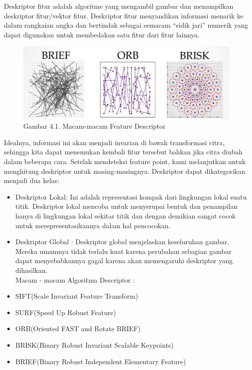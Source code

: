 \documentclass[
  letterpaper,
  DIV=11,
  numbers=noendperiod]{scrreprt}
\providecommand{\tightlist}{%
  \setlength{\itemsep}{0pt}\setlength{\parskip}{0pt}}\usepackage{longtable,booktabs,array}
\begin{document}
Deskriptor fitur adalah algoritme yang mengambil gambar dan menampilkan
deskriptor fitur/vektor fitur. Deskriptor fitur menyandikan informasi
menarik ke dalam rangkaian angka dan bertindak sebagai semacam ``sidik
jari'' numerik yang dapat digunakan untuk membedakan satu fitur dari
fitur lainnya.

\begin{figure}

{\centering \includegraphics{Asset/image12.png}

}

\caption{Gambar 4.1. Macam-macam Feature Descriptor}

\end{figure}

Idealnya, informasi ini akan menjadi invarian di bawah transformasi
citra, sehingga kita dapat menemukan kembali fitur tersebut bahkan jika
citra diubah dalam beberapa cara. Setelah mendeteksi feature point, kami
melanjutkan untuk menghitung deskriptor untuk masing-masingnya.
Deskriptor dapat dikategorikan menjadi dua kelas:

\begin{itemize}
\tightlist
\item
  Deskriptor Lokal: Ini adalah representasi kompak dari lingkungan lokal
  suatu titik. Deskriptor lokal mencoba untuk menyerupai bentuk dan
  penampilan hanya di lingkungan lokal sekitar titik dan dengan demikian
  sangat cocok untuk merepresentasikannya dalam hal pencocokan.\\
\item
  Deskriptor Global : Deskriptor global menjelaskan keseluruhan gambar.
  Mereka umumnya tidak terlalu kuat karena perubahan sebagian gambar
  dapat menyebabkannya gagal karena akan memengaruhi deskriptor yang
  dihasilkan.\\
  Macam - macam Algoritma Descriptor :\\
\item
  SIFT(Scale Invariant Feature Transform)\\
\item
  SURF(Speed Up Robust Feature)\\
\item
  ORB(Oriented FAST and Rotate BRIEF)\\
\item
  BRISK(Binary Robust Invariant Scalable Keypoints)\\
\item
  BRIEF(Binary Robust Independent Elementary Feature)
\end{itemize}
\end{document}
